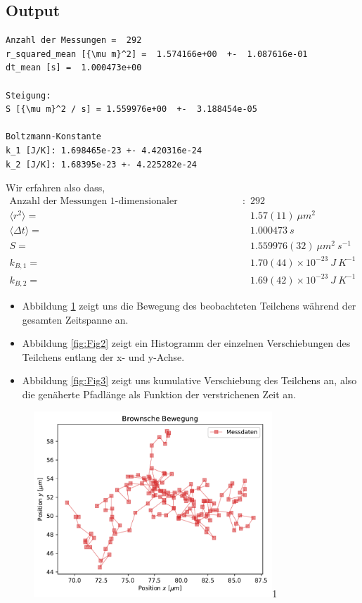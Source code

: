 \documentclass[a4paper,10pt]{article}
\begin{document}
\subsection{Output}
\begin{lstlisting}
Anzahl der Messungen =  292
r_squared_mean [{\mu m}^2] =  1.574166e+00  +-  1.087616e-01
dt_mean [s] =  1.000473e+00

Steigung:
S [{\mu m}^2 / s] = 1.559976e+00  +-  3.188454e-05

Boltzmann-Konstante
k_1 [J/K]: 1.698465e-23 +- 4.420316e-24
k_2 [J/K]: 1.68395e-23 +- 4.225282e-24

\end{lstlisting}
Wir erfahren also dass,
\begin{align*}
\text{Anzahl der Messungen 1-dimensionaler Verschiebungen}: \quad & 292\\
\langle r^2 \rangle  =  &1.57(11)\:{\mu m}^2\\
\langle \Delta t \rangle  =  &1.000473\:s\\
 S  =  &1.559976(32) \:{\mu m}^2\:s^{-1}\\
 k_{B,1} = &1.70(44)\times10^{-23}\:J\:K^{-1}\\
 k_{B,2} = &1.69(42)\times10^{-23}\:J\:K^{-1}
\end{align*}
\begin{itemize}
\item Abbildung \ref{fig:Fig1} zeigt uns die Bewegung des beobachteten Teilchens während der gesamten Zeitspanne an.
\item Abbildung \ref{fig:Fig2} zeigt ein Histogramm der einzelnen Verschiebungen des Teilchens entlang der x- und y-Achse.
\item Abbildung \ref{fig:Fig3} zeigt uns kumulative Verschiebung des Teilchens an, also die genäherte Pfadlänge als Funktion der verstrichenen Zeit an.
\end{itemize}
\begin{figure}[htb]
  \centering
  \begin{annotate}{\includegraphics[width=0.8\textwidth]{223_Fig1.pdf}}{1}
  \end{annotate}
\caption{}
\label{fig:Fig1}
\end{figure}
\end{document}
